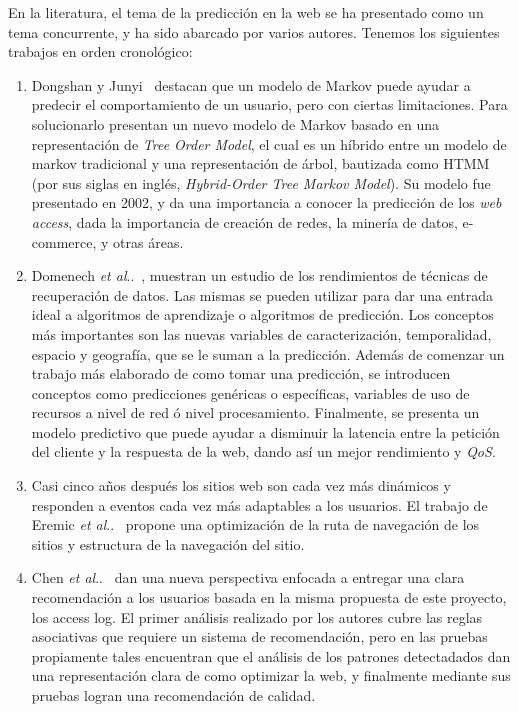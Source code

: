 \documentclass{udparticle}
\makeatletter
\DeclareRobustCommand\onedot{\futurelet\@let@token\@onedot}
\newcommand\@onedot{\ifx\@let@token.\else.\null\fi\xspace}
\newcommand\etal{\emph{et al}\onedot}
\makeatother
\begin{document}
En la literatura, el tema de la predicción en la web se ha presentado como un tema concurrente, y ha sido abarcado por varios autores. 
Tenemos los siguientes trabajos en orden cronológico:

\begin{enumerate}
  \item Dongshan y Junyi~\cite{tmmd} destacan que un modelo de Markov puede ayudar a predecir el comportamiento de un usuario, pero con ciertas limitaciones.
  Para solucionarlo presentan un nuevo modelo de Markov basado en una representación de \emph{Tree Order Model}, el cual es un híbrido entre un modelo de markov tradicional y una representación de árbol, bautizada como HTMM (por sus siglas en inglés, \emph{Hybrid-Order Tree Markov Model}).
  Su modelo fue presentado en 2002, y da una importancia a conocer la predicción de los \emph{web access}, dada la importancia de creación de redes, la minería de datos, e-commerce, y otras áreas.

  \item Domenech \etal~\cite{domenech}, muestran un estudio de los rendimientos de técnicas de recuperación de datos.
  Las mismas se pueden utilizar para dar una entrada ideal a algoritmos de aprendizaje o algoritmos de predicción. 
  Los conceptos más importantes son las nuevas variables de caracterización, temporalidad, espacio y geografía, que se le suman a la predicción. 
  Además de comenzar un trabajo más elaborado de como tomar una predicción, se introducen conceptos como predicciones genéricas o específicas, variables de uso de recursos a nivel de red ó nivel procesamiento.
  Finalmente, se presenta un modelo predictivo que puede ayudar a disminuir la latencia entre la petición del cliente y la respuesta de la web, dando así un mejor rendimiento y \emph{QoS}.

  \item Casi cinco años después los sitios web son cada vez más dinámicos y responden a eventos cada vez más adaptables a los usuarios. 
  El trabajo de Eremic \etal~\cite{Dragica} propone una optimización de la ruta de navegación de los sitios y estructura de la navegación del sitio. 

  \item Chen \etal~\cite{yuhua} dan una nueva perspectiva enfocada a entregar una clara recomendación a los usuarios basada en la misma propuesta de este proyecto, los access log.
  El primer análisis realizado por los autores cubre las reglas asociativas que requiere un sistema de recomendación, pero en las pruebas propiamente tales encuentran que el análisis de los patrones detectadados dan una representación clara de como optimizar la web, y finalmente mediante sus pruebas logran una recomendación de calidad.


\end{enumerate}
\end{document}
